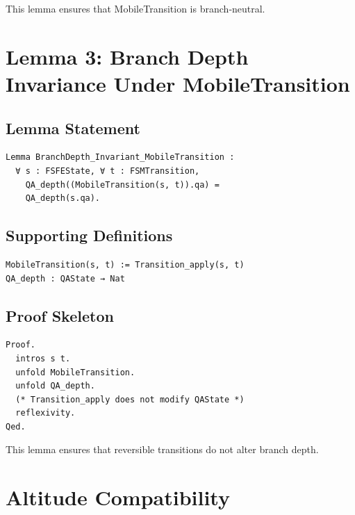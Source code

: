 \documentclass[11pt]{article}
\begin{document}
This lemma ensures that MobileTransition is branch‑neutral.

\newpage


\section{Lemma 3: Branch Depth Invariance Under MobileTransition}

\subsection{Lemma Statement}

\begin{verbatim}
Lemma BranchDepth_Invariant_MobileTransition :
  ∀ s : FSFEState, ∀ t : FSMTransition,
    QA_depth((MobileTransition(s, t)).qa) =
    QA_depth(s.qa).
\end{verbatim}

\subsection{Supporting Definitions}

\begin{verbatim}
MobileTransition(s, t) := Transition_apply(s, t)
QA_depth : QAState → Nat
\end{verbatim}

\subsection{Proof Skeleton}

\begin{verbatim}
Proof.
  intros s t.
  unfold MobileTransition.
  unfold QA_depth.
  (* Transition_apply does not modify QAState *)
  reflexivity.
Qed.
\end{verbatim}

This lemma ensures that reversible transitions do not alter branch depth.

\newpage


\section{Altitude Compatibility}
\end{document}
